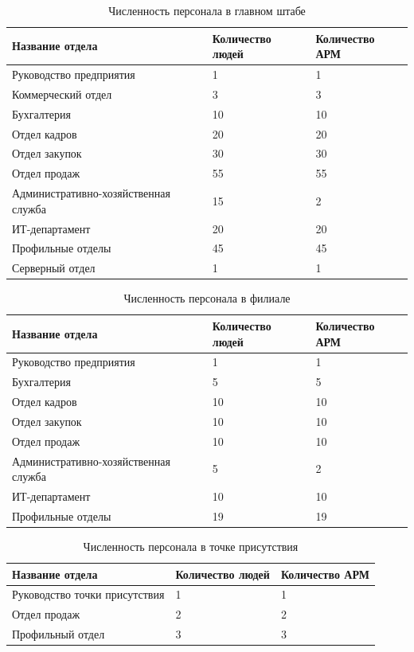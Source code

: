 \documentclass[14pt, a4paper]{extarticle}
\numberwithin{equation}{section}
\begin{document}
\begin{table}[H]
\centering
\small
\caption{Численность персонала в главном штабе}
\label{table:mainDepPopul}
\begin{tabular}{|m{5cm}|m{3cm}|m{3cm}|}
\hline
\textbf{Название отдела} & \textbf{Количество людей} & \textbf{Количество АРМ} \\
\hline
Руководство предприятия & 1 & 1 \\
\hline
Коммерческий отдел & 3 & 3 \\
\hline
Бухгалтерия & 10 & 10 \\
\hline
Отдел кадров & 20 & 20 \\
\hline
Отдел закупок & 30 & 30 \\
\hline
Отдел продаж & 55 & 55 \\
\hline
Административно-хозяйственная служба & 15 & 2 \\
\hline
ИТ-департамент & 20 & 20 \\
\hline
Профильные отделы & 45 & 45 \\
\hline
Серверный отдел & 1 & 1 \\
\hline
\end{tabular}
\end{table}


\begin{table}[H]
\centering
\small
\caption{Численность персонала в филиале}
\label{table:filialPopul}
\begin{tabular}{|m{5cm}|m{3cm}|m{3cm}|}
\hline
\textbf{Название отдела} & \textbf{Количество людей} & \textbf{Количество АРМ} \\
\hline
Руководство предприятия & 1 & 1 \\
\hline
Бухгалтерия & 5 & 5 \\
\hline
Отдел кадров & 10 & 10 \\
\hline
Отдел закупок & 10 & 10 \\
\hline
Отдел продаж & 10 & 10 \\
\hline
Административно-хозяйственная служба & 5 & 2 \\
\hline
ИТ-департамент & 10 & 10 \\
\hline
Профильные отделы & 19 & 19 \\
\hline
\end{tabular}
\end{table}


\begin{table}[H]
\centering
\small
\caption{Численность персонала в точке присутствия}
\label{table:tpPopul}
\begin{tabular}{|m{5cm}|m{3cm}|m{3cm}|}
\hline
\textbf{Название отдела} & \textbf{Количество людей} & \textbf{Количество АРМ} \\
\hline
Руководство точки присутствия & 1 & 1 \\
\hline
Отдел продаж & 2 & 2 \\
\hline
Профильный отдел & 3 & 3 \\
\hline
\end{tabular}
\end{table}
\end{document}
